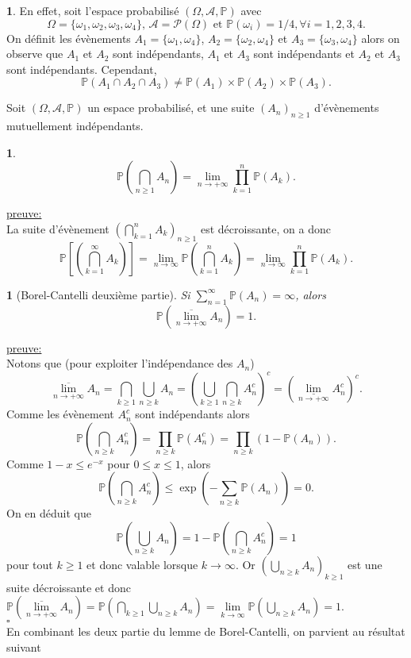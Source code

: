 \documentclass[8pt,notheorems]{beamer}
\def \P {\mathbb P}
\def \limsup{\underset{n\rightarrow+\infty}{\overline{\lim}}}
\def \liminf{\underset{n\rightarrow+\infty}{\underline{\lim}}}
\newtheorem{prop}{\translate{Proposition}}
\newtheorem{lemma}{\translate{Lemme}}
\theoremstyle{definition}
\theoremstyle{example}
\newtheorem{example}{\translate{Exemple}}
\theoremstyle{mystyle}
\theoremstyle{plain}
\begin{document}
\begin{frame}[allowframebreaks]
\begin{example}
En effet, soit l'espace probabilisé $(\Omega,\mathcal{A}, \P)$ avec 
$$
\Omega = \{\omega_1, \omega_2, \omega_3, \omega_4\}\text{, }\mathcal{A} = \mathcal{P}(\Omega)\text{ et }\P(\omega_i) = 1/4,\forall i=1,2,3,4.
$$
On définit les évènements $A_1 = \{\omega_1,\omega_4\}$, $A_2 = \{\omega_2,\omega_4\}$ et $A_3=\{\omega_3,\omega_4\}$ alors on observe que $A_1$ et $A_2$ sont indépendants, $A_1$ et $A_3$ sont indépendants et $A_2$ et $A_3$ sont indépendants. Cependant,
$$
\P(A_1\cap A_2\cap A_3)\neq \P(A_1)\times \P(A_2)\times \P(A_3).
$$
\end{example}
Soit $(\Omega, \mathcal{A}, \P)$ un espace probabilisé, et une suite $(A_n)_{n\geq1}$ d'évènements mutuellement indépendants. 
\begin{prop}
$$
\P\left(\bigcap_{n\geq1}A_n\right) = \underset{n\rightarrow +\infty}{\lim}\prod_{k=1}^{n}\P(A_k).
$$
\end{prop}
\underline{preuve:}\\
La suite d'évènement $\left(\bigcap_{k=1}^{n}A_k\right)_{n\geq1}$ est décroissante, on a donc 
$$
\P\left[\left(\bigcap_{k=1}^{\infty}A_k\right)\right] =\underset{n\rightarrow \infty}{\lim} \P\left(\bigcap_{k=1}^{n}A_k\right) = \underset{n\rightarrow \infty}{\lim}\prod_{k=1}^{n} \P\left(A_k\right). 
$$
\begin{lemma}[Borel-Cantelli deuxième partie]
Si $\sum_{n=1}^{\infty} \P(A_n) = \infty$, alors 
$$
\P(\limsup A_n) = 1.
$$
\end{lemma}
\underline{preuve:}\\
Notons que (pour exploiter l'indépendance des $A_n$)
$$
\limsup A_n = \bigcap_{k\geq1}\bigcup_{n\geq k}A_n = \left(\bigcup_{k\geq1}\bigcap_{n\geq k}A_n^c\right)^c =\left(\liminf A_n^c\right)^c. 
$$
Comme les évènement $A_n^{c}$ sont indépendants alors  
$$
\P\left(\bigcap_{n\geq k} A_n^c\right) = \prod_{n\geq k}\P(A_n^c) = \prod_{n\geq k}(1-\P(A_n)).
$$
Comme $1-x\leq e^{-x}$ pour $0\leq x\leq1$, alors 
$$
\P\left(\bigcap_{n\geq k} A_n^c\right) \leq \exp\left(-\sum_{n\geq k} \P(A_n)\right) = 0.
$$
On en déduit que 
$$
\P\left(\bigcup_{n\geq k} A_n\right) = 1-\P\left(\bigcap_{n\geq k} A_n^c\right) = 1
$$
pour tout $k\geq 1$ et donc valable lorsque $k\rightarrow \infty$. Or $\left(\bigcup_{n\geq k} A_n\right)_{k\geq1}$ est une suite décroissante et donc 
$\P(\limsup A_n) = \P(\bigcap_{k\geq 1}\bigcup_{n\geq k} A_n) = \underset{k\rightarrow \infty}{\lim} \P\left(\bigcup_{n\geq k} A_n\right) = 1$. \\
$\square$\\
En combinant les deux partie du lemme de Borel-Cantelli, on parvient au résultat suivant

\end{frame}
\end{document}
